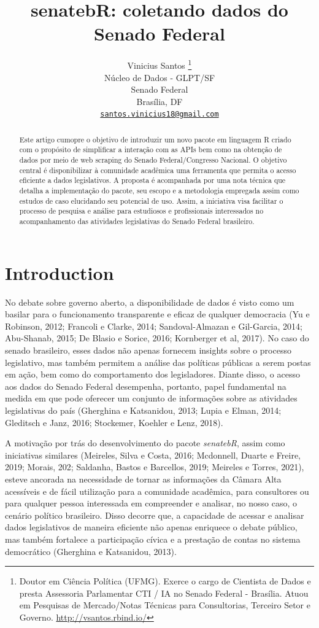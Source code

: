 \documentclass{article}
\title{senatebR: coletando dados do Senado Federal}
\author{
    Vinicius Santos
    \thanks{Doutor em Ciência Política (UFMG). Exerce o cargo de
Cientista de Dados e presta Assessoria Parlamentar CTI / IA no Senado
Federal - Brasília. Atuou em Pesquisas de Mercado/Notas Técnicas para
Consultorias, Terceiro Setor e Governo. \url{http://vsantos.rbind.io/}}
   \\
    Núcleo de Dados - GLPT/SF \\
    Senado Federal \\
  Brasília, DF \\
  \texttt{\href{mailto:santos.vinicius18@gmail.com}{\nolinkurl{santos.vinicius18@gmail.com}}} \\
  }
\begin{document}
\maketitle


\begin{abstract}
Este artigo cumopre o objetivo de introduzir um novo pacote em linguagem
R criado com o propósito de simplificar a interação com as APIs bem como
na obtenção de dados por meio de web scraping do Senado
Federal/Congresso Nacional. O objetivo central é disponibilizar à
comunidade acadêmica uma ferramenta que permita o acesso eficiente a
dados legislativos. A proposta é acompanhada por uma nota técnica que
detalha a implementação do pacote, seu escopo e a metodologia empregada
assim como estudos de caso elucidando seu potencial de uso. Assim, a
iniciativa visa facilitar o processo de pesquisa e análise para
estudiosos e profissionais interessados no acompanhamento das atividades
legislativas do Senado Federal brasileiro.
\end{abstract}


\hypertarget{introduction}{%
\section{Introduction}\label{introduction}}

No debate sobre governo aberto, a disponibilidade de dados é visto como
um basilar para o funcionamento transparente e eficaz de qualquer
democracia (Yu e Robinson, 2012; Francoli e Clarke, 2014;
Sandoval-Almazan e Gil-Garcia, 2014; Abu-Shanab, 2015; De Blasio e
Sorice, 2016; Kornberger et al, 2017). No caso do senado brasileiro,
esses dados não apenas fornecem insights sobre o processo legislativo,
mas também permitem a análise das políticas públicas a serem postas em
ação, bem como do comportamento dos legisladores. Diante disso, o acesso
aos dados do Senado Federal desempenha, portanto, papel fundamental na
medida em que pode oferecer um conjunto de informações sobre as
atividades legislativas do país (Gherghina e Katsanidou, 2013; Lupia e
Elman, 2014; Gleditsch e Janz, 2016; Stockemer, Koehler e Lenz, 2018).

A motivação por trás do desenvolvimento do pacote \emph{senatebR}, assim
como iniciativas similares (Meireles, Silva e Costa, 2016; Mcdonnell,
Duarte e Freire, 2019; Morais, 202; Saldanha, Bastos e Barcellos, 2019;
Meireles e Torres, 2021), esteve ancorada na necessidade de tornar as
informações da Câmara Alta acessíveis e de fácil utilização para a
comunidade acadêmica, para consultores ou para qualquer pessoa
interessada em compreender e analisar, no nosso caso, o cenário político
brasileiro. Disso decorre que, a capacidade de acessar e analisar dados
legislativos de maneira eficiente não apenas enriquece o debate público,
mas também fortalece a participação cívica e a prestação de contas no
sistema democrático (Gherghina e Katsanidou, 2013).
\end{document}
